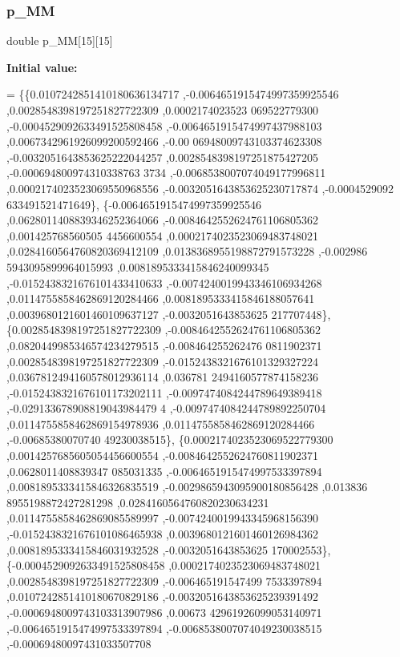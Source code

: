 \subsubsection{\texorpdfstring{p\+\_\+\+MM}{p\_MM}}
{\footnotesize\ttfamily double p\+\_\+\+MM\mbox{[}15\mbox{]}\mbox{[}15\mbox{]}}

{\bfseries Initial value\+:}
\begin{DoxyCode}
= \{\{0.0107242851410180636134717 ,-0.0064651915474997359925546 ,0.0028548398197251827722309 ,0.0002174023523
      069522779300 ,-0.0004529092633491525808458 ,-0.0064651915474997437988103 ,0.0067342961926099200592466 ,-0.00
      06948009743103374623308 ,-0.0032051643853625222044257 ,0.0028548398197251875427205 ,-0.000694800974310338763
      3734 ,-0.0068538007074049177996811 ,0.0002174023523069550968556 ,-0.0032051643853625230717874 ,-0.0004529092
      633491521471649\},
\{-0.0064651915474997359925546 ,0.0628011408839346252364066 ,-0.0084642552624761106805362 ,0.001425768560505
      4456600554 ,0.0002174023523069483748021 ,0.0284160564760820369412109 ,0.0138368955198872791573228 ,-0.002986
      5943095899964015993 ,0.0081895333415846240099345 ,-0.0152438321676101433410633 ,-0.0074240019943346106934268
       ,0.0114755858462869120284466 ,0.0081895333415846188057641 ,0.0039680121601460109637127 ,-0.0032051643853625
      217707448\},
\{0.0028548398197251827722309 ,-0.0084642552624761106805362 ,0.0820449985346574234279515 ,-0.008464255262476
      0811902371 ,0.0028548398197251827722309 ,-0.0152438321676101329327224 ,0.0367812494160578012936114 ,0.036781
      2494160577874158236 ,-0.0152438321676101173202111 ,-0.0097474084244789649389418 ,-0.029133678908819043984479
      4 ,-0.0097474084244789892250704 ,0.0114755858462869154978936 ,0.0114755858462869120284466 ,-0.00685380070740
      49230038515\},
\{0.0002174023523069522779300 ,0.0014257685605054456600554 ,-0.0084642552624760811902371 ,0.0628011408839347
      085031335 ,-0.0064651915474997533397894 ,0.0081895333415846326835519 ,-0.0029865943095900180856428 ,0.013836
      8955198872427281298 ,0.0284160564760820230634231 ,0.0114755858462869085589997 ,-0.0074240019943345968156390 
      ,-0.0152438321676101086465938 ,0.0039680121601460126984362 ,0.0081895333415846031932528 ,-0.0032051643853625
      170002553\},
\{-0.0004529092633491525808458 ,0.0002174023523069483748021 ,0.0028548398197251827722309 ,-0.006465191547499
      7533397894 ,0.0107242851410180670829186 ,-0.0032051643853625239391492 ,-0.0006948009743103313907986 ,0.00673
      42961926099053140971 ,-0.0064651915474997533397894 ,-0.0068538007074049230038515 ,-0.00069480097431033507708

\end{DoxyCode}
